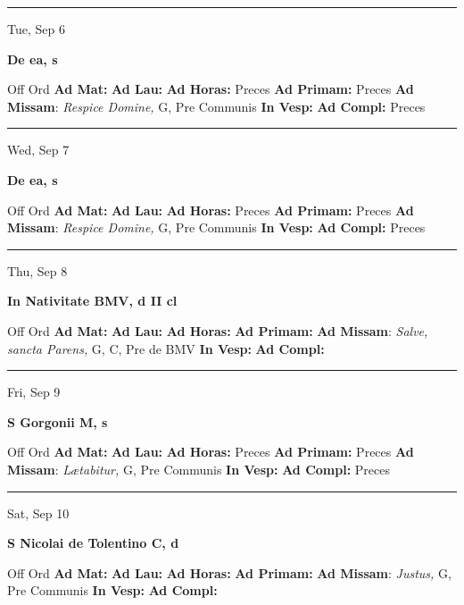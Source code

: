 \documentclass[letterpaper, 10pt]{article}
\begin{document}
\hrule
\begin{center}
Tue, Sep 6
\end{center}\textbf{ \large De ea, \textnormal{\normalsize s}}
\begin{justify}
Off Ord
\textbf{Ad Mat: }
\textbf{Ad Lau: }
\textbf{Ad Horas: }Preces
\textbf{Ad Primam: }Preces
\textbf{Ad Missam}: \textit{Respice Domine,} G, Pre Communis
\textbf{In Vesp: }
\textbf{Ad Compl: }Preces\end{justify}



\hrule
\begin{center}
Wed, Sep 7
\end{center}\textbf{ \large De ea, \textnormal{\normalsize s}}
\begin{justify}
Off Ord
\textbf{Ad Mat: }
\textbf{Ad Lau: }
\textbf{Ad Horas: }Preces
\textbf{Ad Primam: }Preces
\textbf{Ad Missam}: \textit{Respice Domine,} G, Pre Communis
\textbf{In Vesp: }
\textbf{Ad Compl: }Preces\end{justify}



\hrule
\begin{center}
Thu, Sep 8
\end{center}\textbf{ \large In Nativitate BMV, \textnormal{\normalsize d II cl}}
\begin{justify}
Off Ord
\textbf{Ad Mat: }
\textbf{Ad Lau: }
\textbf{Ad Horas: }
\textbf{Ad Primam: }
\textbf{Ad Missam}: \textit{Salve, sancta Parens,} G, C, Pre de BMV
\textbf{In Vesp: }
\textbf{Ad Compl: }\end{justify}



\hrule
\begin{center}
Fri, Sep 9
\end{center}\textbf{ \large S Gorgonii M, \textnormal{\normalsize s}}
\begin{justify}
Off Ord
\textbf{Ad Mat: }
\textbf{Ad Lau: }
\textbf{Ad Horas: }Preces
\textbf{Ad Primam: }Preces
\textbf{Ad Missam}: \textit{Lætabitur,} G, Pre Communis
\textbf{In Vesp: }
\textbf{Ad Compl: }Preces\end{justify}



\hrule
\begin{center}
Sat, Sep 10
\end{center}\textbf{ \large S Nicolai de Tolentino C, \textnormal{\normalsize d}}
\begin{justify}
Off Ord
\textbf{Ad Mat: }
\textbf{Ad Lau: }
\textbf{Ad Horas: }
\textbf{Ad Primam: }
\textbf{Ad Missam}: \textit{Justus,} G, Pre Communis
\textbf{In Vesp: }
\textbf{Ad Compl: }\end{justify}
\end{document}
